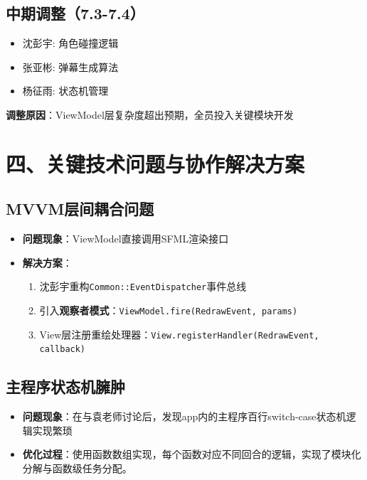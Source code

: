 \documentclass{article}
\begin{document}
\subsection{中期调整（7.3-7.4）}
\begin{itemize}
    \item 沈彭宇: 角色碰撞逻辑
    \item 张亚彬: 弹幕生成算法
    \item 杨征雨: 状态机管理
\end{itemize}

\textbf{调整原因}：ViewModel层复杂度超出预期，全员投入关键模块开发

\section{四、关键技术问题与协作解决方案}

\subsection{MVVM层间耦合问题}
\begin{itemize}
    \item \textbf{问题现象}：ViewModel直接调用SFML渲染接口
    \item \textbf{解决方案}：
    \begin{enumerate}
        \item 沈彭宇重构\texttt{Common::EventDispatcher}事件总线
        \item 引入\textbf{观察者模式}：\texttt{ViewModel.fire(RedrawEvent, params)}
        \item View层注册重绘处理器：\texttt{View.registerHandler(RedrawEvent, callback)}
    \end{enumerate}
\end{itemize}

\subsection{主程序状态机臃肿}
\begin{itemize}
    \item \textbf{问题现象}：在与袁老师讨论后，发现app内的主程序百行switch-case状态机逻辑实现繁琐
    \item \textbf{优化过程}：使用函数数组实现，每个函数对应不同回合的逻辑，实现了模块化分解与函数级任务分配。
\end{itemize}
\end{document}
